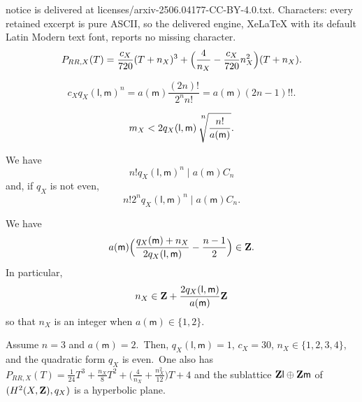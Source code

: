 \documentclass[10pt,a4paper]{amsart}
\def\Z{{\bf Z}}
\def\lll{\ensuremath{\mathsf l}}
\def\mm{\ensuremath{\mathsf m}}
\begin{document}
notice is delivered at licenses/arxiv-2506.04177-CC-BY-4.0.txt. Characters: every retained excerpt is pure ASCII, so the delivered engine, XeLaTeX with its default Latin Modern text font, reports no missing character.
\begin{equation}\label{prr3} 
P_{RR,X}(T)= \frac{c_X}{720}(T+n_X)^3 +\Bigl(\frac{4}{n_X}-\frac{c_X}{720}n_X^2\Bigr) (T+n_X).
\end{equation}

\begin{equation} \label{cxa}
c_Xq_X(\lll,\mm)^n=a(\mm)\frac{(2n)!}{2^nn!}=a(\mm)(2n-1)!!.
\end{equation}

\begin{equation}\label{mxroot}
m_X < 2q_X(\lll,\mm) \sqrt[\leftroot{-3}\uproot{16}  {\scriptstyle {n}}]{\frac{  n!}{a(\mm) }}.
\end{equation}

\begin{lemm}\label{le1}
We have
$$
n! q_X(\lll,\mm)^n \mid a(\mm)C_n$$
and,  if $q_X$ is not even,
$$n! 2^n q_X(\lll,\mm)^n \mid a(\mm)C_n.$$

\end{lemm}

\begin{lemm}\label{le2}
 We have 
\begin{equation*}\label{eq}
a(\mm) \Bigl( \frac{q_X(\mm)+n_X}{2q_X(\lll,\mm)  }-\frac{n-1}2   \Bigr)     \in \Z.
\end{equation*}
In particular,
$$n_X\in   \Z+ \frac{2q_X(\lll,\mm) }{a(\mm)}\Z $$
so that $n_X $ is an integer when $ a(\mm)\in \{1,2\}$.
\end{lemm}

\begin{prop}\label{prop45}
Assume $n=3$ and $a(\mm)=2$.\ Then,
 $q_X(\lll,\mm)=1$, $c_X=30$, $n_X \in\{1,2,3,4 \}$, and the quadratic form $q_X$ is even.\ One also has $P_{RR,X}(T)=
   \frac{1}{24}T^3+\frac{n_X}{8}T^2+
 \bigl(\frac{4}{n_X}+\frac{n_X^2}{12}\bigr)T
  +4$
and the sublattice $\Z\lll\oplus \Z\mm$ of $(H^2(X,\Z),q_X)$ is a hyperbolic plane.
\end{prop}
\end{document}
